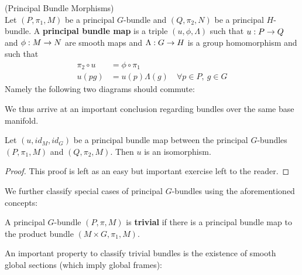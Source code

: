 \begin{definition} (Principal Bundle Morphisms)\\
  Let $(P,\pi_1,M)$ be a principal $G$-bundle and $(Q,\pi_2, N)$ be a principal $H$-bundle. A \textbf{principal bundle map} is a triple $(u, \phi, \Lambda)$ such that $u: P \rightarrow Q$ and $\phi: M \ra N$ are smooth maps and $\Lambda: G \rightarrow H$ is a group homomorphism and such that
  \begin{align}
    \pi_2 \circ u &= \phi \circ \pi_1\\
    u(pg) &= u(p) \Lambda(g) \quad \forall p \in P, \ g\in G
  \end{align}
  Namely the following two diagrams should commute:
\end{definition}

We thus arrive at an important conclusion regarding bundles over the same base manifold.

\begin{theo}
  Let $(u,id_M,id_G)$ be a principal bundle map between the principal $G$-bundles $(P,\pi_1,M)$ and $(Q,\pi_2,M)$. Then $u$ is an isomorphism.
\begin{proof}
  This proof is left as an easy but important exercise left to the reader.
\end{proof}
\end{theo}

We further classify special cases of principal $G$-bundles using the aforementioned concepts:

\begin{definition}
  A principal $G$-bundle $(P,\pi,M)$ is \textbf{trivial} if there is a principal bundle map to the product bundle $(M\times G, \pi_1, M)$.
\end{definition}

An important property to classify trivial bundles is the existence of smooth global sections (which imply global frames):

